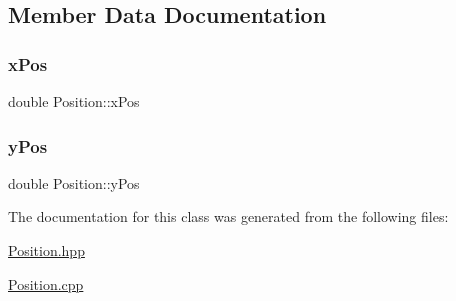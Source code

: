 \subsection{Member Data Documentation}
\mbox{\label{class_position_a14ec3b05a733470d871518491601669f}} 
\subsubsection{\texorpdfstring{x\+Pos}{xPos}}
{\footnotesize\ttfamily double Position\+::x\+Pos\hspace{0.3cm}{\ttfamily [protected]}}

\mbox{\label{class_position_ad6bf63afed8bcc92e4fb74b7d5d7eabc}} 
\subsubsection{\texorpdfstring{y\+Pos}{yPos}}
{\footnotesize\ttfamily double Position\+::y\+Pos\hspace{0.3cm}{\ttfamily [protected]}}



The documentation for this class was generated from the following files\+:\begin{DoxyCompactItemize}
\item 
\mbox{\hyperlink{_position_8hpp}{Position.\+hpp}}\item 
\mbox{\hyperlink{_position_8cpp}{Position.\+cpp}}\end{DoxyCompactItemize}
